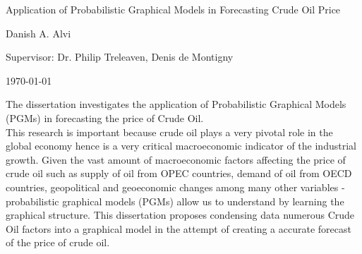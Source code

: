 \documentclass[a4paper]{article}
\begin{document}

\Large
 \begin{center}
Application of Probabilistic Graphical Models in Forecasting Crude Oil Price\\ 

\hspace{10pt}

\large
Danish A. Alvi \\

\hspace{10pt}

\large
Supervisor: Dr. Philip Treleaven, Denis de Montigny \\

\hspace{10pt}

\today

\hspace{10pt}

\end{center}

\hspace{10pt}

\normalsize

The dissertation investigates the application of Probabilistic Graphical Models (PGMs) in forecasting the price of Crude Oil. \\

This research is important because crude oil plays a very pivotal role in the global economy hence is a very critical macroeconomic indicator of the industrial growth. Given the vast amount of macroeconomic factors affecting the price of crude oil such as supply of oil from OPEC countries, demand of oil from OECD countries, geopolitical and geoeconomic changes among many other variables - probabilistic graphical models (PGMs) allow us to understand by learning the graphical structure. This dissertation proposes condensing data numerous Crude Oil factors into a graphical model in the attempt of creating a accurate forecast of the price of crude oil. \\
\end{document}
